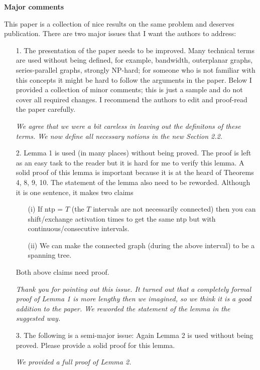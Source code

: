 \documentclass[11pt,a4paper]{article}
\begin{document}
\textbf{Major comments}

This paper is a collection of nice results on the same problem and deserves publication. There are two major issues that I want the authors to address:

\begin{itemize}

\item[1.] The presentation of the paper needs to be improved. Many technical terms are used without being defined, for example, bandwidth, outerplanar graphs, series-parallel graphs, strongly NP-hard; for someone who is not familiar with this concepts it might be hard to follow the arguments in the paper. Below I provided a collection of minor comments; this is just a sample and do not cover all required changes. I recommend the authors to edit and proof-read the paper carefully.

\textit{We agree that we were a bit careless in leaving out the definitons of these terms. We now define all necessary notions in the new Section 2.2.}

\item[2.] Lemma 1 is used (in many places) without being proved. The proof is left as an easy task to the reader but it is hard for me to verify this lemma. A solid proof of this lemma is important because it is at the heard of Theorems 4, 8, 9, 10.
The statement of the lemma also need to be reworded. Although it is one sentence, it makes two claims
\begin{itemize}

\item[(i)] If ntp = $T$ (the $T$ intervals are not necessarily connected) then you can shift/exchange activation times to get the same ntp but with continuous/consecutive intervals.

\item[(ii)] We can make the connected graph (during the above interval) to be a spanning tree.

\end{itemize}
Both above claims need proof.


\textit{Thank you for pointing out this issue. It turned out that a completely formal proof of Lemma 1 is more lengthy then we imagined, so we think it is a good addition to the paper. We reworded the statement of the lemma in the suggested way.}

\item[3.] The following is a semi-major issue: Again Lemma 2 is used without being proved. Please provide a solid proof for this lemma.

\textit{We provided a full proof of Lemma 2.}

\end{itemize}
\end{document}
